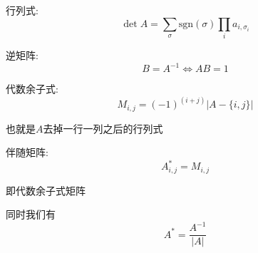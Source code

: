 行列式: $$\det A = \sum_{\sigma} \text{sgn}(\sigma) \prod_{i}a_{i, \sigma_i}$$

逆矩阵: $$B = A^{-1} \iff AB = 1$$

代数余子式: $$M_{i, j} = (-1)^{(i + j)} \left| A - \{i, j\} \right|$$

也就是$A$去掉一行一列之后的行列式

伴随矩阵: $$A^{*}_{i, j} = M_{i, j}$$

即代数余子式矩阵

同时我们有 $$ A^{*} = \frac {A^{-1}} {|A|} $$
